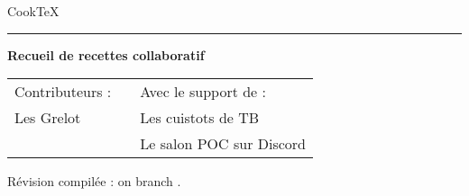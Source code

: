 \thispagestyle{empty}

\newenvironment{vcenterpage}
{\newpage\vspace*{\fill}}
{\vspace*{\fill}\par\pagebreak}
\def\thickhrulefill{\leavevmode \leaders \hrule height 1pt\hfill \kern \z@}



\begin{titlepage}
\begin{tabular}{p{10cm}p{5cm}}
\end{tabular}    
\vspace*{1.5cm}

\begin{flushleft}
\huge Cook\TeX
\end{flushleft}
\par
\hrule height 4pt
\par
\begin{flushright}
\textcolor[gray]{0.5}{\LARGE \textbf{Recueil de recettes collaboratif}}
\end{flushright}

\vspace*{9cm}

\begin{center}
\begin{tabular}{lp{3cm}l}
\textcolor[gray]{0.4}{\large Contributeurs :} & & \textcolor[gray]{0.4}{\large Avec le support de :}\\
Les Grelot & & Les cuistots de TB\\
 & & Le salon POC sur Discord\\
\end{tabular}
\end{center}

\vspace*{2cm}

Révision compilée : \texttt{\commit} on branch \texttt{\branch}.

\end{titlepage}


